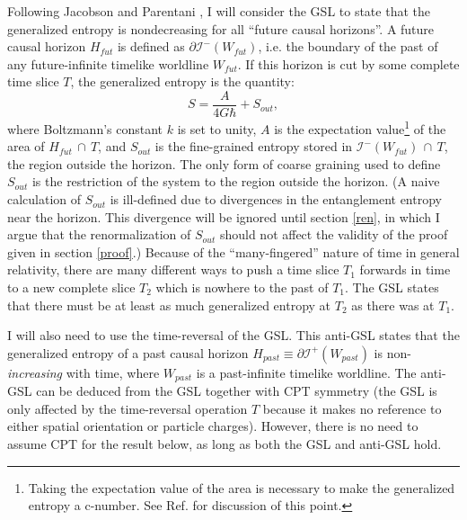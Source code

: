 \documentclass{article}
\begin{document}
Following Jacobson and Parentani \cite{JP03}, I will consider the GSL to state that the generalized entropy is nondecreasing for all ``future causal horizons''.  A future causal horizon $H_{fut}$ is defined as $\partial \mathcal{I}^-(W_{fut})$, i.e. the boundary of the past of any future-infinite timelike worldline $W_{fut}$.  If this horizon is cut by some complete time slice $T$, the generalized entropy is the quantity:
\begin{equation}\label{gen}
S = \frac{A}{4G\hbar} + S_{out},
\end{equation}
where Boltzmann's constant $k$ is set to unity, $A$ is the expectation value\footnote{Taking the expectation value of the area is necessary to make the generalized entropy a c-number.  See Ref. \cite{10proofs} for discussion of this point.} of the area of $H_{fut}\,\cap\,T$, and $S_{out}$ is the fine-grained entropy stored in $\mathcal{I}^-(W_{fut})\,\cap\,T$, the region outside the horizon.  The only form of coarse graining used to define $S_{out}$ is the restriction of the system to the region outside the horizon.  (A naive calculation of $S_{out}$ is ill-defined due to divergences in the entanglement entropy near the horizon.  This divergence will be ignored until section \ref{ren}, in which I argue that the renormalization of $S_{out}$ should not affect the validity of the proof given in section \ref{proof}.)  Because of the ``many-fingered'' nature of time in general relativity, there are many different ways to push a time slice $T_1$ forwards in time to a new complete slice $T_2$ which is nowhere to the past of $T_1$.  The GSL states that there must be at least as much generalized entropy at $T_2$ as there was at $T_1$.

I will also need to use the time-reversal of the GSL.  This anti-GSL states that the generalized entropy of a past causal horizon $H_{past} \equiv \partial \mathcal{I}^+(W_{past})$ is non-\emph{increasing} with time, where $W_{past}$ is a past-infinite timelike worldline.  The anti-GSL can be deduced from the GSL together with CPT symmetry (the GSL is only affected by the time-reversal operation $T$ because it makes no reference to either spatial orientation or particle charges).  However, there is no need to assume CPT for the result below, as long as both the GSL and anti-GSL hold.
\end{document}
